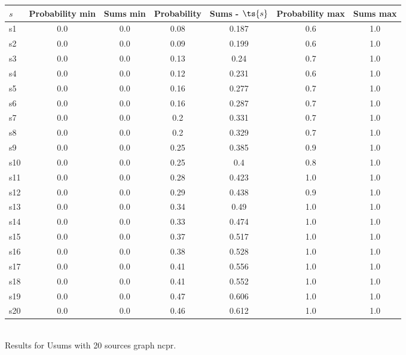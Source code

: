 \documentclass{article}
\begin{document}
\noindent\begin{tabular}{|l|c|c|c|c|c|c|}
\hline
$s$& Probability min & Sums min & Probability & Sums - $\ts{s}$ & Probability max & Sums max\\
\hline
s1 &0.0 & 0.0 & 0.08 & 0.187 & 0.6 & 1.0\\
\hline
s2 &0.0 & 0.0 & 0.09 & 0.199 & 0.6 & 1.0\\
\hline
s3 &0.0 & 0.0 & 0.13 & 0.24 & 0.7 & 1.0\\
\hline
s4 &0.0 & 0.0 & 0.12 & 0.231 & 0.6 & 1.0\\
\hline
s5 &0.0 & 0.0 & 0.16 & 0.277 & 0.7 & 1.0\\
\hline
s6 &0.0 & 0.0 & 0.16 & 0.287 & 0.7 & 1.0\\
\hline
s7 &0.0 & 0.0 & 0.2 & 0.331 & 0.7 & 1.0\\
\hline
s8 &0.0 & 0.0 & 0.2 & 0.329 & 0.7 & 1.0\\
\hline
s9 &0.0 & 0.0 & 0.25 & 0.385 & 0.9 & 1.0\\
\hline
s10 &0.0 & 0.0 & 0.25 & 0.4 & 0.8 & 1.0\\
\hline
s11 &0.0 & 0.0 & 0.28 & 0.423 & 1.0 & 1.0\\
\hline
s12 &0.0 & 0.0 & 0.29 & 0.438 & 0.9 & 1.0\\
\hline
s13 &0.0 & 0.0 & 0.34 & 0.49 & 1.0 & 1.0\\
\hline
s14 &0.0 & 0.0 & 0.33 & 0.474 & 1.0 & 1.0\\
\hline
s15 &0.0 & 0.0 & 0.37 & 0.517 & 1.0 & 1.0\\
\hline
s16 &0.0 & 0.0 & 0.38 & 0.528 & 1.0 & 1.0\\
\hline
s17 &0.0 & 0.0 & 0.41 & 0.556 & 1.0 & 1.0\\
\hline
s18 &0.0 & 0.0 & 0.41 & 0.552 & 1.0 & 1.0\\
\hline
s19 &0.0 & 0.0 & 0.47 & 0.606 & 1.0 & 1.0\\
\hline
s20 &0.0 & 0.0 & 0.46 & 0.612 & 1.0 & 1.0\\
\hline
\end{tabular}\\

\noindent Results for Usums with 20 sources graph ncpr.
\end{document}

